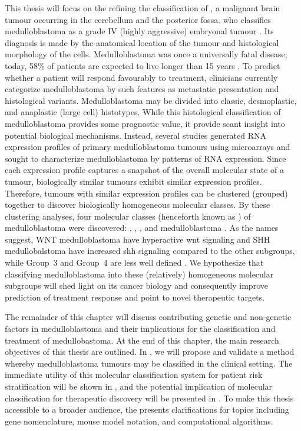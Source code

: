 This thesis will focus on the refining the classification of , a malignant brain tumour occurring in the cerebellum and the posterior fossa. \gls{who} classifies medulloblastoma as a grade IV (highly aggressive) embryonal tumour . Its diagnosis is made by the anatomical location of the tumour and histological morphology of the cells. Medulloblastoma was once a universally fatal disease; today, 58\% of patients are expected to live longer than 15 years . To predict whether a patient will respond favourably to treatment, clinicians currently categorize medulloblastoma by such features as metastatic presentation and histological variants. Medulloblastoma may be divided into classic, desmoplastic, and anaplastic (large cell) histotypes. While this histological classification of medulloblastoma provides some prognostic value, it provide scant insight into potential biological mechanisms. Instead, several studies generated RNA expression profiles of primary medulloblastoma tumours using microarrays and sought to characterize medulloblastoma by patterns of RNA expression. Since each expression profile captures a snapshot of the overall molecular state of a tumour, biologically similar tumours exhibit similar expression profiles. Therefore, tumours with similar expression profiles can be clustered (grouped) together to discover biologically homogeneous molecular classes. By these clustering analyses, four molecular classes (henceforth known as ) of medulloblastoma were discovered: , , , and  medulloblastoma . As the names suggest, WNT medulloblastoma have hyperactive \gls{wnt} signaling and SHH medullobalstoma have increased \gls{shh} signaling compared to the other subgroups, while Group~3 and Group~4 are less well defined . We hypothesize that classifying medulloblastoma into these (relatively) homogeneous molecular subgroups will shed light on its cancer biology and consequently improve prediction of treatment response and point to novel therapeutic targets.

The remainder of this chapter will discuss contributing genetic and non-genetic factors in medulloblastoma and their implications for the classification and treatment of medullobastoma. At the end of this chapter, the main research objectives of this thesis are outlined. In , we will propose and validate a method whereby medulloblastoma tumours may be classified in the clinical setting. The immediate utility of this molecular classification system for patient risk stratification will be shown in , and the potential implication of molecular classification for therapeutic discovery will be presented in . To make this thesis accessible to a broader audience, the  presents clarifications for topics including gene nomenclature, mouse model notation, and computational algorithms.


